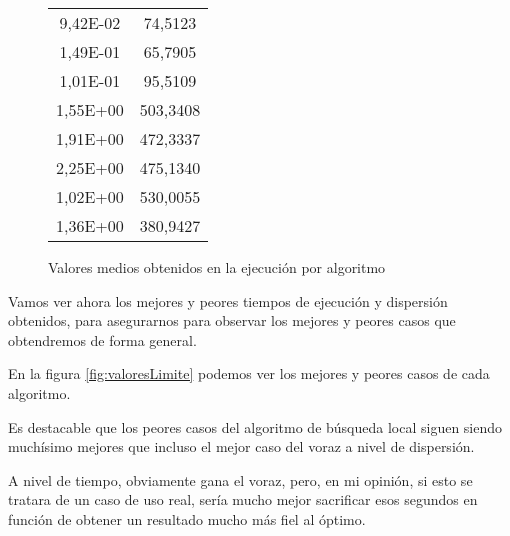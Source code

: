 \begin{figure}[h]
\begin{minipage}[c]{0.32\textwidth}
\begin{tabular}{|c|c|}
            9,42E-02 & 74,5123\\
            1,49E-01 & 65,7905\\
            1,01E-01 & 95,5109\\
            1,55E+00 & 503,3408\\
            1,91E+00 & 472,3337\\
            2,25E+00 & 475,1340\\
            1,02E+00 & 530,0055\\
            1,36E+00 & 380,9427\\
	        \hline
	    \end{tabular}
	\end{minipage}
	\caption{Valores medios obtenidos en la ejecución por algoritmo}
	\label{fig:valoresMedios}
\end{figure}

\newpage

Vamos ver ahora los mejores y peores tiempos de ejecución y dispersión obtenidos, para asegurarnos para observar los mejores y peores casos que obtendremos de forma general.

En la figura \ref{fig:valoresLimite} podemos ver los mejores y peores casos de cada algoritmo.

Es destacable que los peores casos del algoritmo de búsqueda local siguen siendo muchísimo mejores que incluso el mejor caso del voraz a nivel de dispersión.

A nivel de tiempo, obviamente gana el voraz, pero, en mi opinión, si esto se tratara de un caso de uso real, sería mucho mejor sacrificar esos segundos en función de obtener un resultado mucho más fiel al óptimo.


